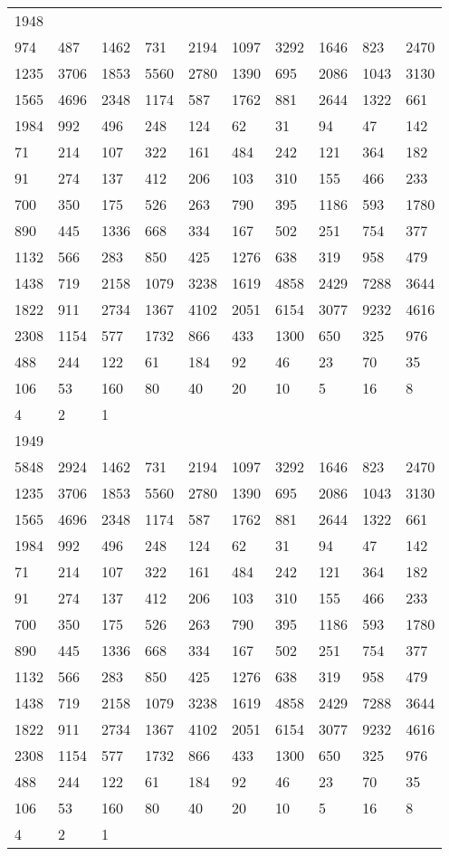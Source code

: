 \begin{longtable}{*{10}{l}}
1948&&&&&&&&&\\
974& 487& 1462& 731& 2194& 1097& 3292& 1646& 823& 2470\\
1235& 3706& 1853& 5560& 2780& 1390& 695& 2086& 1043& 3130\\
1565& 4696& 2348& 1174& 587& 1762& 881& 2644& 1322& 661\\
1984& 992& 496& 248& 124& 62& 31& 94& 47& 142\\
71& 214& 107& 322& 161& 484& 242& 121& 364& 182\\
91& 274& 137& 412& 206& 103& 310& 155& 466& 233\\
700& 350& 175& 526& 263& 790& 395& 1186& 593& 1780\\
890& 445& 1336& 668& 334& 167& 502& 251& 754& 377\\
1132& 566& 283& 850& 425& 1276& 638& 319& 958& 479\\
1438& 719& 2158& 1079& 3238& 1619& 4858& 2429& 7288& 3644\\
1822& 911& 2734& 1367& 4102& 2051& 6154& 3077& 9232& 4616\\
2308& 1154& 577& 1732& 866& 433& 1300& 650& 325& 976\\
488& 244& 122& 61& 184& 92& 46& 23& 70& 35\\
106& 53& 160& 80& 40& 20& 10& 5& 16& 8\\
4& 2& 1& \\

1949&&&&&&&&&\\
5848& 2924& 1462& 731& 2194& 1097& 3292& 1646& 823& 2470\\
1235& 3706& 1853& 5560& 2780& 1390& 695& 2086& 1043& 3130\\
1565& 4696& 2348& 1174& 587& 1762& 881& 2644& 1322& 661\\
1984& 992& 496& 248& 124& 62& 31& 94& 47& 142\\
71& 214& 107& 322& 161& 484& 242& 121& 364& 182\\
91& 274& 137& 412& 206& 103& 310& 155& 466& 233\\
700& 350& 175& 526& 263& 790& 395& 1186& 593& 1780\\
890& 445& 1336& 668& 334& 167& 502& 251& 754& 377\\
1132& 566& 283& 850& 425& 1276& 638& 319& 958& 479\\
1438& 719& 2158& 1079& 3238& 1619& 4858& 2429& 7288& 3644\\
1822& 911& 2734& 1367& 4102& 2051& 6154& 3077& 9232& 4616\\
2308& 1154& 577& 1732& 866& 433& 1300& 650& 325& 976\\
488& 244& 122& 61& 184& 92& 46& 23& 70& 35\\
106& 53& 160& 80& 40& 20& 10& 5& 16& 8\\
4& 2& 1& \\


\end{longtable}
